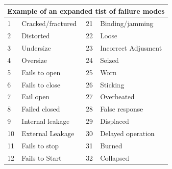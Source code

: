 \documentclass[./dissertation.tex]{subfiles}
\begin{document}
\begin{table}[]
\begin{tabular}{@{}llll@{}}
\toprule
\multicolumn{4}{l}{Example of an expanded tist of failure modes}                                                                                      \\ \midrule
1                          & Cracked/fractured                                 & 21                       & Binding/jamming                           \\
2                          & Distorted                                         & 22                       & Loose                                     \\
3                          & Undersize                                         & 23                       & Incorrect Adjusment                       \\
4                          & Oversize                                          & 24                       & Seized                                    \\
5                          & Fails to open                                     & 25                       & Worn                                      \\
6                          & Fails to close                                    & 26                       & Sticking                                  \\
7                          & Fail open                                         & 27                       & Overheated                                \\
8                          & Failed closed                                     & 28                       & False response                            \\
9                          & Internal leakage                                  & 29                       & Displaced                                 \\
10                         & External Leakage                                  & 30                       & Delayed operation                         \\
11                         & Fails to stop                                     & 31                       & Burned                                    \\
12                         & Fails to Start                                    & 32                       & Collapsed                                 \\

\end{tabular}
\end{table}
\end{document}
